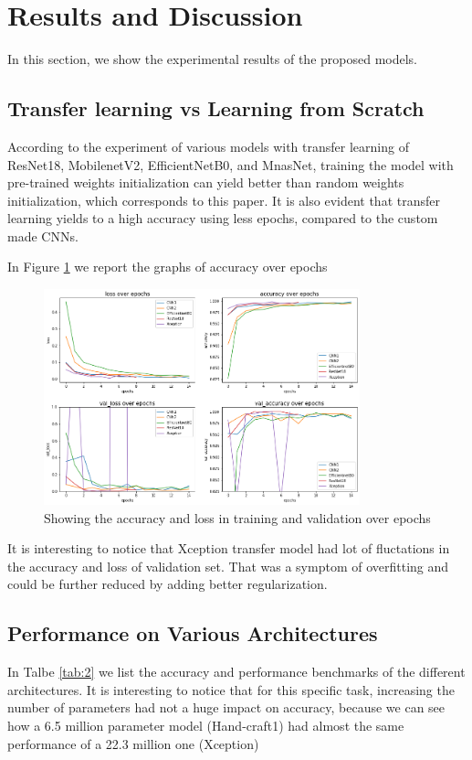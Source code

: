 \documentclass[conference]{IEEEtran}
\begin{document}

\section{Results and Discussion}
In this section, we show the experimental results of the proposed models. 
\subsection{Transfer learning vs Learning from Scratch}
According to the experiment of various models with transfer learning of ResNet18, MobilenetV2, EfficientNetB0, and MnasNet, training the model with pre-trained weights initialization can yield better than random weights initialization, which corresponds to this paper\cite{kornblith2019better}. 
It is also evident that transfer learning yields to a high accuracy using less epochs, compared to the custom made CNNs.


In Figure \ref{bench} we report the graphs of accuracy over epochs

\begin{figure}[h]
\centering
\includegraphics[width=3.6in]{performance_5.png}
\caption{Showing the accuracy and loss in training and validation over epochs}
\label{bench}
\end{figure}

It is interesting to notice that Xception transfer model had lot of fluctations in the accuracy and loss of validation set. That was a symptom of overfitting and could be further reduced by adding better regularization. 

\subsection{Performance on Various Architectures}
In Talbe \ref{tab:2} we list the accuracy and performance benchmarks of the different architectures. It is interesting to notice that for this specific task, increasing the number of parameters had not a huge impact on accuracy, because we can see how a 6.5 million parameter model (Hand-craft1) had almost the same performance of a 22.3 million one (Xception)
\end{document}
